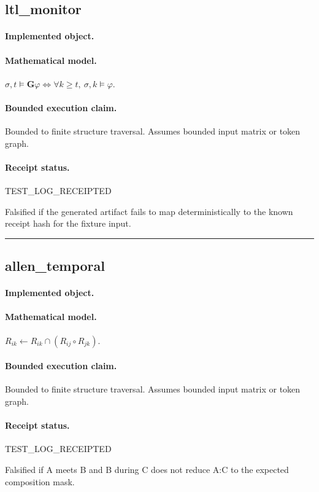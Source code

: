 \subsection{ltl\_monitor}
\paragraph{Implemented object.} 
\paragraph{Mathematical model.} $\sigma,t\models \mathbf{G}\varphi \iff \forall k\ge t,\ \sigma,k\models\varphi.$
\paragraph{Bounded execution claim.} Bounded to finite structure traversal. Assumes bounded input matrix or token graph.
\paragraph{Receipt status.} TEST\_LOG\_RECEIPTED
\begin{falsifier}
Falsified if the generated artifact fails to map deterministically to the known receipt hash for the fixture input.
\end{falsifier}

\vspace{1em}\hrule\vspace{1em}
\subsection{allen\_temporal}
\paragraph{Implemented object.} 
\paragraph{Mathematical model.} $R_{ik}\leftarrow R_{ik}\cap(R_{ij}\circ R_{jk}).$
\paragraph{Bounded execution claim.} Bounded to finite structure traversal. Assumes bounded input matrix or token graph.
\paragraph{Receipt status.} TEST\_LOG\_RECEIPTED
\begin{falsifier}
Falsified if A meets B and B during C does not reduce A:C to the expected composition mask.
\end{falsifier}

